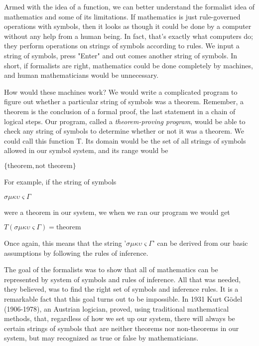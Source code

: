 Armed with the idea of a function, we can better understand the formalist idea of mathematics and some of its limitations.  If mathematics is just rule-governed operations with symbols, then it looks as though it could be done by a computer without any help from a human being.  In fact, that's exactly what computers do; they perform operations on strings of symbols according to rules.  We input a string of symbols, press "Enter" and out comes another string of symbols.  In short, if formalists are right, mathematics could be done completely by machines, and human mathematicians would be unnecessary.

How would these machines work?  We would write a complicated program to figure out whether a particular string of symbols was a theorem.  Remember, a theorem is the conclusion of a formal proof, the last statement in a chain of logical steps. Our program, called a \emph{theorem-proving program}, would be able to check any string of symbols to determine whether or not it was a theorem. We could call this function T.  Its domain would be the set of all strings of symbols allowed in our symbol system, and its range would be 
\begin{center}
$\{\text{theorem},\text{not theorem}\}$
\end{center}   

For example, if the string of symbols  
\begin{center}
$\sigma\mu\kappa\upsilon\varsigma\Gamma$
\end{center} 
were a theorem in our system, we when we ran our program we would get
\begin{center}
$T(\sigma\mu\kappa\upsilon\varsigma\Gamma)= \text{theorem}$
\end{center} 
Once again, this means that the string '$\sigma\mu\kappa\upsilon\varsigma\Gamma$' can be derived from our basic assumptions by following the rules of inference.

The goal of the formalists was to show that all of mathematics can be represented by system of symbols and rules of inference.  All that was needed, they believed, was to find the right set of symbols and inference rules.  It is a remarkable fact that this goal turns out to be impossible.  In 1931 Kurt G\"{o}del (1906-1978), an Austrian logician, proved, using traditional mathematical methods, that, regardless of how we set up our system, there will always be certain strings of symbols that are neither theorems nor non-theorems in our system, but may recognized as true or false by mathematicians. 

